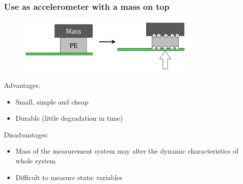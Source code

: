 \documentclass[class=report, crop=false, 12pt,a4paper]{standalone}
\begin{document}
\subsubsection{Use as accelerometer with a mass on top}
\begin{figure}[H]
  \centering
  \includegraphics[width = 0.8\textwidth]{../img/Mdiagram39.png}
\end{figure}
Advantages:
\begin{itemize}
  \item Small, simple and cheap
  \item Durable (little degradation in time)
\end{itemize}
Disadvantages:
\begin{itemize}
  \item Mass of the measurement system may alter the dynamic characteristics of whole system
  \item Difficult to measure static variables
\end{itemize}
\end{document}
